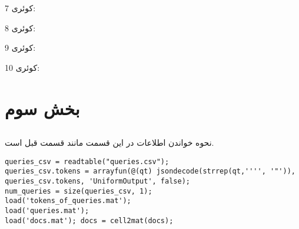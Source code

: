 \newline\newline کوئری 7:
\newline{}

\newline\newline کوئری 8:
\newline{}

\newline\newline کوئری 9:
\newline{}

\newline\newline کوئری 10:
\newline{}








\subsection{} %







\section{بخش سوم}


\subsection{} %
نحوه خواندن اطلاعات در این قسمت مانند قسمت قبل است.

\begin{latin}
\begin{lstlisting}
queries_csv = readtable("queries.csv");
queries_csv.tokens = arrayfun(@(qt) jsondecode(strrep(qt,'''', '"')), queries_csv.tokens, 'UniformOutput', false);
num_queries = size(queries_csv, 1);
load('tokens_of_queries.mat');
load('queries.mat');
load('docs.mat'); docs = cell2mat(docs);
\end{lstlisting}
\end{latin}



\subsection{} %


